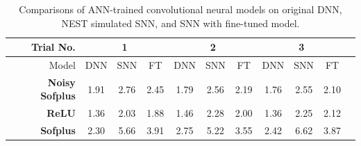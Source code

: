 	
	\begin{table}[ph!] 
		\caption{Comparisons of ANN-trained convolutional neural models on original DNN, NEST simulated SNN, and SNN with fine-tuned model.}
		\begin{center}
			\bgroup
			\def\arraystretch{2.5}
			\begin{tabular} {r c  c c c c c c c c c}
				Trial No.
				&\multicolumn{3}{c}{1} 
				&\multicolumn{3}{c}{2}
				&\multicolumn{3}{c}{3}\\
				\hline
				Model
				& DNN & SNN &FT
				& DNN & SNN &FT
				& DNN & SNN &FT\\
				\hline
				\textbf{Noisy Sofplus}
				& 1.91 & 2.76 &2.45
				& 1.79 & 2.56 &2.19
				& 1.76 & 2.55 &2.10\\
				\textbf{ReLU}
				& 1.36 & 2.03 &1.88
				& 1.46 & 2.28 &2.00
				& 1.36 & 2.25 &2.12\\
				\textbf{Sofplus}
				& 2.30 & 5.66 &3.91
				& 2.75 & 5.22 &3.55
				& 2.42 & 6.62 &3.87\\
				\hline
			\end{tabular}
			\egroup
			\label{tbl:ns_result}
		\end{center}
	\end{table}
	
